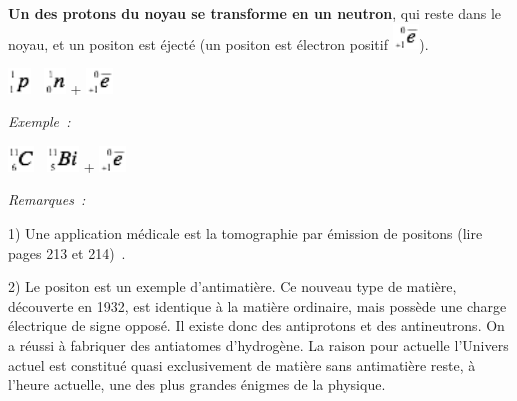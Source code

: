 \textbf{Un des protons du noyau se transforme en un neutron}, qui reste
dans le noyau, et un positon est éjecté (un positon est électron positif
\includegraphics[width=0.706cm,height=0.683cm]{Pictures/1000000100000014000000131B1712312E317641.png}).

\includegraphics[width=0.613cm,height=0.683cm]{Pictures/10000001000000110000001313D14D1355E58698.png}

\includegraphics[width=0.565cm,height=0.683cm]{Pictures/10000001000000100000001354D441094A28B79D.png}
+
\includegraphics[width=0.706cm,height=0.683cm]{Pictures/1000000100000014000000131B1712312E317641.png}

\emph{Exemple~: }

\includegraphics[width=0.683cm,height=0.683cm]{Pictures/10000001000000130000001334A778854DA43436.png}

\includegraphics[width=0.847cm,height=0.683cm]{Pictures/10000001000000180000001378E4F6B83F114C0B.png}
+
\includegraphics[width=0.706cm,height=0.683cm]{Pictures/1000000100000014000000131B1712312E317641.png}

\emph{Remarques~: }

1) Une application médicale est la tomographie par émission de positons
(lire pages 213 et 214)~.

2) Le positon est un exemple d'antimatière. Ce nouveau type de matière,
découverte en 1932, est identique à la matière ordinaire, mais possède
une charge électrique de signe opposé. Il existe donc des antiprotons et
des antineutrons. On a réussi à fabriquer des antiatomes d'hydrogène. La
raison pour actuelle l'Univers actuel est constitué quasi exclusivement
de matière sans antimatière reste, à l'heure actuelle, une des plus
grandes énigmes de la physique.

